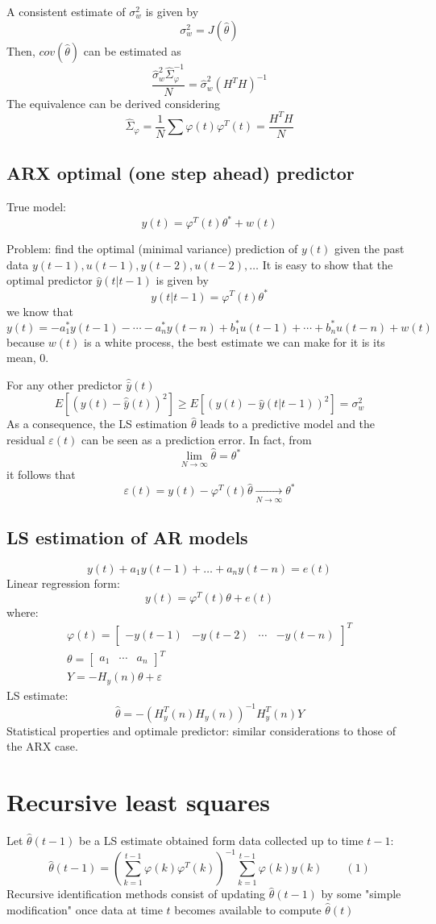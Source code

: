 \documentclass{book}
\theoremstyle{definition}
\theoremstyle{remark}
\theoremstyle{remark}
\begin{document}
A consistent estimate of $\sigma_w^2$ is given by
\[
    \sigma_w^2=J(\hat{\theta})
\]
Then, $cov(\hat{\theta})$ can be estimated as
\[
    \frac{\hat{\sigma}_w^2\hat{\Sigma}_{\varphi}^{-1}}{N} = \hat{\sigma}_w^2(H^TH)^{-1}
\]
The equivalence can be derived considering
\[
    \hat{\Sigma}_{\varphi}=\frac{1}{N}\sum \varphi(t)\varphi^T(t)=\frac{H^TH}{N}
\]
\subsection{ARX optimal (one step ahead) predictor}
True model:
\[
    y(t)=\varphi^T(t)\theta^*+w(t)
\]

Problem: find the optimal (minimal variance) prediction of $y(t)$ given the past data $y(t-1),u(t-1),y(t-2),u(t-2),\dots$
It is easy to show that the optimal predictor $\hat{y}(t|t-1)$ is given by
\[
    y(t|t-1)=\varphi^T(t)\theta^*
\]
we know that
\[
    y(t)=-a_1^*y(t-1)-\cdots-a_n^*y(t-n)+b_1^*u(t-1)+\cdots+b_n^*u(t-n)+w(t)
\]
because $w(t)$ is a white process, the best estimate we can make for it is its mean, $0$.

For any other predictor $\hat{\bar{y}}(t)$
\[
    E[(y(t)-\hat{\bar{y}}(t))^2]\geq E[(y(t)-\hat{y}(t|t-1))^2]=\sigma_w^2
\]
As a consequence, the LS estimation $\hat{\theta}$ leads to a predictive model and the residual $\varepsilon(t)$ can be seen as a prediction error. In fact, from
\[
    \lim_{N\to\infty}\hat{\theta}=\theta^*
\]
it follows that
\[
    \varepsilon(t)=y(t)-\varphi^T(t)\hat{\theta}\xrightarrow[N\to\infty]{} \theta^*
\]
\subsection{LS estimation of AR models}
\[
    y(t)+a_1y(t-1)+\dots+a_ny(t-n)=e(t)
\]
Linear regression form:
\[
    y(t)=\varphi^T(t)\theta+e(t)
\]
where:
\begin{gather*}
    \varphi(t)=\begin{bmatrix}
        -y(t-1) & -y(t-2) & \cdots & -y(t-n)
    \end{bmatrix}^T\\
    \theta=\begin{bmatrix} a_1 & \cdots & a_n \end{bmatrix}^T\\
    Y= -H_y(n)\theta+\varepsilon
\end{gather*}
LS estimate:
\[
    \hat{\theta}=-(H_y^T(n)H_y(n))^{-1}H_y^T(n)Y
\]
Statistical properties and optimale predictor: similar considerations to those of the ARX case.
\section{Recursive least squares}
Let $\hat{\theta}(t-1)$ be a LS estimate obtained form data collected up to time $t-1$:
\[
    \hat{\theta}(t-1)=\left(\sum_{k=1}^{t-1}\varphi(k)\varphi^T(k)\right)^{-1} \sum_{k=1}^{t-1}\varphi(k)y(k) \qquad(1)
\]
Recursive identification methods consist of updating $\hat{\theta}(t-1)$ by some "simple modification" once data at time $t$ becomes available to compute $\hat{\theta}(t)$
\end{document}
